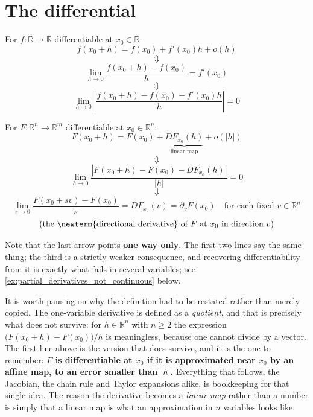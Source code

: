 
\section{The differential}
\label{sec:the_differential}

For $f : \mathbb{R}\to\mathbb{R}$ differentiable at $x_0 \in \mathbb{R}$:
\[f(x_0+h) = f(x_0) + f'(x_0)h + o(h)\]
\[\Updownarrow\]
\[\lim_{h\to 0}\frac{f(x_0+h)-f(x_0)}{h} = f'(x_0)\]
\[\Updownarrow\]
\[\lim_{h\to 0}\left|\frac{f(x_0+h)-f(x_0)-f'(x_0)h}{h}\right| = 0\]

For $F : \mathbb{R}^n \to \mathbb{R}^m$ differentiable at $x_0 \in \mathbb{R}^n$:
\[F(x_0+h) = F(x_0) + \underbrace{DF_{x_0}(h)}_{\text{linear map}} + o(|h|)\]
\[\Updownarrow\]
\[\lim_{h\to 0}\frac{|F(x_0+h)-F(x_0)-DF_{x_0}(h)|}{|h|} = 0\]
\[\Downarrow\]
\[\lim_{s\to 0}\frac{F(x_0+sv)-F(x_0)}{s} = DF_{x_0}(v) = \partial_vF(x_0) \quad \text{for each fixed } v \in \mathbb{R}^n\]
\[\text{(the \newterm{directional derivative} of } F \text{ at } x_0 \text{ in direction } v\text{)}\]

Note that the last arrow points \textbf{one way only}. The first two lines say the same thing;
the third is a strictly weaker consequence, and recovering differentiability from it is exactly
what fails in several variables; see \cref{ex:partial_derivatives_not_continuous} below.

It is worth pausing on why the definition had to be restated rather than merely copied. The
one-variable derivative is defined as a \emph{quotient}, and that is precisely what does not
survive: for $h \in \mathbb{R}^n$ with $n \geq 2$ the expression
$\big(F(x_0+h)-F(x_0)\big)/h$ is meaningless, because one cannot divide by a vector. The first
line above is the version that does survive, and it is the one to remember: \textbf{$F$ is
differentiable at $x_0$ if it is approximated near $x_0$ by an affine map, to an error smaller
than $|h|$.} Everything that follows, the Jacobian, the chain rule and Taylor expansions alike,
is bookkeeping for that single idea. The reason the derivative becomes a \emph{linear map} rather
than a number is simply that a linear map is what an approximation in $n$ variables looks like.


